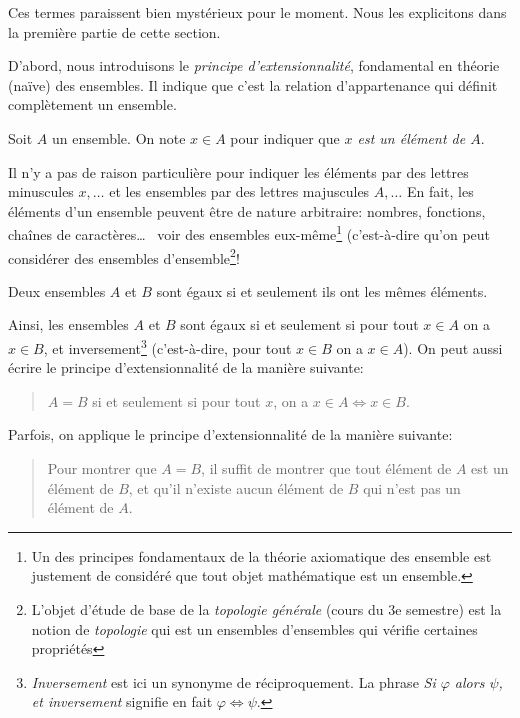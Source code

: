 \documentclass[french,course,oneside,theoremnosection]{lecture}
\newcommand{\ifff}{\Leftrightarrow}
\begin{document}
Ces termes paraissent bien mystérieux pour le moment. Nous les explicitons dans la première partie de cette section.

D'abord, nous introduisons le \emph{principe d'extensionnalité}, fondamental en théorie (naïve) des ensembles. Il indique que c'est la relation d'appartenance qui définit complètement un ensemble.

\begin{notation}
Soit $A$ un ensemble. On note $x\in A$ pour indiquer que \emph{$x$ est un élément de $A$}.
\end{notation}

Il n'y a pas de raison particulière pour indiquer les éléments par des lettres minuscules $x, \ldots$ et les ensembles par des lettres majuscules $A, \ldots$ En fait, les éléments d'un ensemble peuvent être de nature arbitraire: nombres, fonctions, chaînes de caractères\ldots ~ voir des ensembles eux-même\footnote{Un des principes fondamentaux de la théorie axiomatique des ensemble est justement de considéré que tout objet mathématique est un ensemble.} (c'est-à-dire qu'on peut considérer des ensembles d'ensemble\footnote{L'objet d'étude de base de la \emph{topologie générale} (cours du 3e semestre) est la notion de \emph{topologie} qui est un ensembles d'ensembles qui vérifie certaines propriétés}!

\begin{definition}
Deux ensembles $A$ et $B$ sont égaux si et seulement ils ont les mêmes éléments.
\end{definition}

Ainsi, les ensembles $A$ et $B$ sont égaux si et seulement si pour tout $x\in A$
  on a $x\in B$, et inversement\footnote{\emph{Inversement} est ici un synonyme de réciproquement. La phrase \emph{Si $\varphi$ alors $\psi$, et \emph{inversement}} signifie en fait $\varphi \ifff \psi$.} (c'est-à-dire, pour tout $x\in B$ on a $x\in A$). On peut aussi écrire le principe d'extensionnalité de la manière suivante:
  \begin{quotation}
$A=B$ si et seulement si pour tout $x$, on a $x\in A \iff x\in B$.
\end{quotation} 
Parfois, on applique le principe d'extensionnalité de la manière suivante:
\begin{quotation}
Pour montrer que $A=B$, il suffit de montrer que tout élément de $A$ est un élément de $B$, et qu'il n'existe aucun élément de $B$ qui n'est pas un élément de $A$.
\end{quotation}
\end{document}
